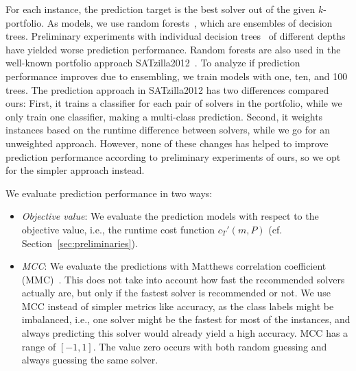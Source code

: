 \documentclass[conference]{IEEEtran}
\begin{document}
For each instance, the prediction target is the best solver out of the given $k$-portfolio. %
As models, we use random forests~\cite{breiman2001random}, which are ensembles of decision trees. 
Preliminary experiments with individual decision trees~\cite{breiman1984classification} of different depths have yielded worse prediction performance. %
Random forests are also used in the well-known portfolio approach SATzilla2012~\cite{xu2012satzilla2012}. 
To analyze if prediction performance improves due to ensembling, we train models with one, ten, and 100 trees.
The prediction approach in SATzilla2012 has two differences compared ours:
First, it trains a classifier for each pair of solvers in the portfolio, while we only train one classifier, making a multi-class prediction.
Second, it weights instances based on the runtime difference between solvers, while we go for an unweighted approach.
However, none of these changes has helped to improve prediction performance according to preliminary experiments of ours, so we opt for the simpler approach instead. %

We evaluate prediction performance in two ways:

\begin{itemize}
	\item \emph{Objective value}:
	We evaluate the prediction models with respect to the objective value, i.e., the runtime cost function $c_{T}'(m,P)$ (cf. Section~\ref{sec:preliminaries}). 
	\item \emph{MCC}:
	We evaluate the predictions with Matthews correlation coefficient (MMC)~\cite{matthews1975comparison, gorodkin2004comparing}.
	This does not take into account how fast the recommended solvers actually are, but only if the fastest solver is recommended or not.
	We use MCC instead of simpler metrics like accuracy, as the class labels might be imbalanced, i.e., one solver might be the fastest for most of the instances, and always predicting this solver would already yield a high accuracy.
	MCC has a range of $[-1,1]$. 
	The value zero occurs with both random guessing and always guessing the same solver.
\end{itemize}
\end{document}
